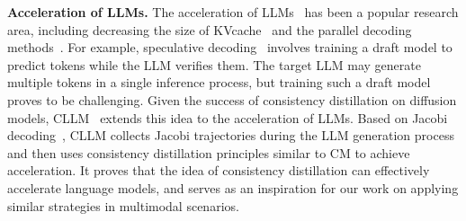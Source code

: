 
\noindent \textbf{Acceleration of LLMs.} 
The acceleration of LLMs~\cite{kwon2023efficient,dao2022flashattention,song2023powerinfer,cai2024medusa,dao2023flashattention} has been a popular research area, including decreasing the size of KVcache~\cite{liu2024kivi,hooper2024kvquant,lin2024qserve} and the parallel decoding methods~\cite{li2024eagle,li2024eagle1,fu2024break}. 
For example, speculative decoding~\cite{leviathan2023fast} involves training a draft model to predict tokens while the LLM verifies them. 
The target LLM may generate multiple tokens in a single inference process, but training such a draft model proves to be challenging.
Given the success of consistency distillation on diffusion models, CLLM~\cite{kou2024cllms} extends this idea to the acceleration of LLMs. 
Based on Jacobi decoding~\cite{song2021accelerating}, CLLM collects Jacobi trajectories during the LLM generation process and then uses consistency distillation principles similar to CM to achieve acceleration. 
It proves that the idea of consistency distillation can effectively accelerate language models, and serves as an inspiration for our work on applying similar strategies in multimodal scenarios.



